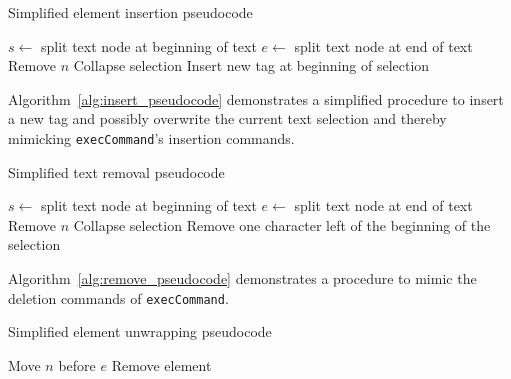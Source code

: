 
\begin{algorithm}
\caption{Simplified element insertion pseudocode}
\label{alg:insert_pseudocode}
\begin{algorithmic}[1]
  \State $s \gets$ split text node at beginning of text
  \State $e \gets$ split text node at end of text
    \State Remove $n$
  \EndFor
  \State Collapse selection
\EndIf
\State Insert new tag at beginning of selection
\EndProcedure
\end{algorithmic}
\end{algorithm}

Algorithm~\ref{alg:insert_pseudocode} demonstrates a simplified procedure to insert a new tag and possibly overwrite the current text selection and thereby mimicking \texttt{execCommand}'s insertion commands.

\begin{algorithm}
\caption{Simplified text removal pseudocode}
\label{alg:remove_pseudocode}
\begin{algorithmic}[1]
  \State $s \gets$ split text node at beginning of text
  \State $e \gets$ split text node at end of text
    \State Remove $n$
  \EndFor
  \State Collapse selection
\Else
  \State Remove one character left of the beginning of the selection
\EndIf
\EndProcedure
\end{algorithmic}
\end{algorithm}

Algorithm~\ref{alg:remove_pseudocode} demonstrates a procedure to mimic the deletion commands of \texttt{execCommand}.

\begin{algorithm}
\caption{Simplified element unwrapping pseudocode}
\label{alg:unwrap_pseudocode}
\begin{algorithmic}[1]
    \State Move $n$ before $e$
  \EndFor
\EndProcedure
\State Remove element
\end{algorithmic}
\end{algorithm}

